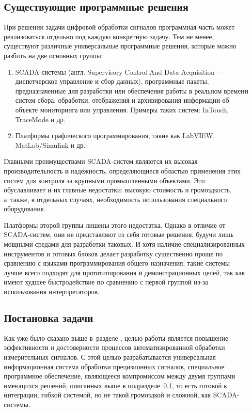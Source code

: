 \documentclass[a4paper, 14pt]{extarticle}
\begin{document}
  \subsection{Существующие программные решения}\label{ssec:existing}

  При решении задачи цифровой обработки сигналов программная часть может реализоваться отдельно под
  каждую конкретную задачу.
  Тем не менее, существуют различные универсальные программные решения, которые можно разбить на две
  основных группы:
  \begin{enumerate}
    \item SCADA-системы (англ. Supervisory Control And Data Acquisition — диспетчерское управление и
      сбор данных), программные пакеты, предназначенные для разработки или обеспечения работы в
      реальном времени систем сбора, обработки, отображения и архивирования информации об объекте
      мониторинга или управления. \cite{boyer-scada}
      Примеры таких систем: InTouch, TraceMode и др.
    \item Платформы графического программирования, такие как LabVIEW, MatLab/Simulink и др.
  \end{enumerate}

  Главными преимуществами SCADA-систем являются их высокая производительность и надёжность,
  определяющиеся областью применения этих систем для контроля за крупными промышленными объектами.
  Это обуславливает и их главные недостатки: высокую стоимость и громоздкость, а~также, в отдельных
  случаях, необходимость использования специального оборудования.

  Платформы второй группы лишены этого недостатка. Однако в отличие от SCADA-систем, они не
  представляют из себя готовые решения, будучи лишь мощными средами для разработки таковых.
  И хотя наличие специализированных инструментов и готовых блоков делает разработку существенно
  проще по сравнению с языками программирования общего назначения, такие системы лучше всего
  подходят для прототипирования и демонстрационных целей, так как имеют худшее быстродействие по
  сравнению с первой группой из-за использования интерпретаторов.

  \subsection{Постановка задачи}\label{ssec:task}

  Как уже было сказано выше в~разделе ,
  целью работы является повышение эффективности и достоверности процессов автоматизированной
  обработки измерительных сигналов. С этой целью разрабатывается универсальная информационная
  система обработки прецизионных сигналов,
  специальное программное обеспечение,
  являющееся компромиссом между двумя группами имеющихся решений, описанных выше в
  подразделе~\ref{ssec:existing}, то есть готовой к интеграции, гибкой системой, но не такой
  громоздкой и сложной, как SCADA-системы.
\end{document}
